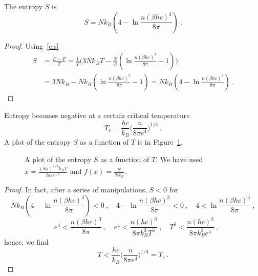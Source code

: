    The entropy $S$ is 
    \begin{equation*}
        S = N k_B (4 - \ln \frac{n (\beta h c)^3}{8\pi} ) ~.
    \end{equation*}
    \begin{proof}
        Using~\eqref{c:s}
        \begin{equation*}
        \begin{aligned}
            S & = \frac{E - F}{T} = \frac{1}{T} \Big ( 3 N k_B T - \frac{N}{\beta} (\ln \frac{n (\beta h c)^3}{8\pi} - 1)  \Big ) \\ & = 3 N k_B - N k_B (\ln \frac{n (\beta h c)^3}{8\pi} - 1) = N k_B (4 - \ln \frac{n (\beta h c)^3}{8\pi} ) ~.
        \end{aligned}
        \end{equation*}
    \end{proof}
    Entropy becomes negative at a certain critical temperature
    \begin{equation*}
        T_c = \frac{hc}{k_B} \Big (\frac{n}{8\pi e^4} \Big)^{1/3} ~.
    \end{equation*}
    A plot of the entropy $S$ as a function of $T$ is in Figure~\ref{fig:c:ent3}.
    \begin{figure}
        \centering
        \caption{A plot of the entropy $S$ as a function of $T$. We have used $x = \frac{(8 \pi)^{1/3} k_B T}{h c n^{1/3}}$ and $f(x) = \frac{S}{N k_B}$.}
        \label{fig:c:ent3}
    \end{figure}
    \begin{proof}
        In fact, after a series of manipulations, $S < 0$ for 
        \begin{equation*}
            N k_B (4 - \ln \frac{n (\beta h c)^3}{8\pi} ) < 0 ~, \quad  4 - \ln \frac{n (\beta h c)^3}{8\pi} < 0 ~, \quad 4 < \ln \frac{n (\beta h c)^3}{8\pi} ~,
        \end{equation*}
        \begin{equation*}
             \quad e^{4} < \frac{n (\beta h c)^3}{8\pi} ~, \quad e^{4} < \frac{n (h c)^3}{8\pi k_B^3 T^3}  ~, \quad T^3 < \frac{n (h c)^3}{8\pi k_B^3 e^4} ~,
        \end{equation*}
        hence, we find
        \begin{equation*}
            T < \frac{hc}{k_B} \Big (\frac{n}{8\pi e^4} \Big)^{1/3} = T_c ~.
        \end{equation*}
    \end{proof}
    
